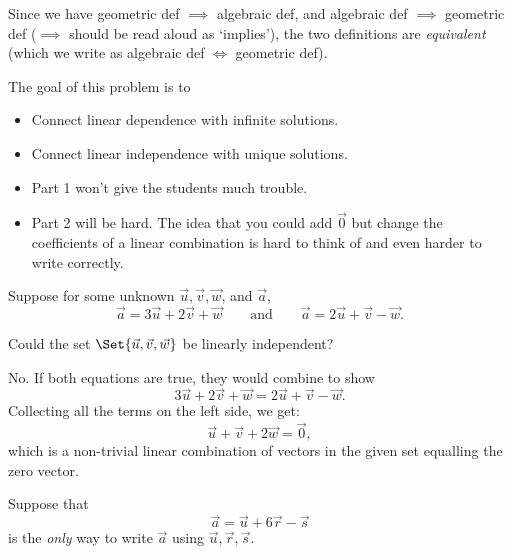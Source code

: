 	Since we have geometric def $\implies$ algebraic def, and algebraic def $\implies$ geometric def
	($\implies$ should be read aloud as `implies'), the two definitions
	are \emph{equivalent} (which we write as algebraic def $\iff$ geometric def).


	\displayonlynewpage
	\bookonlynewpage
	\question
	\begin{annotation}
		\begin{goals}

			The goal of this problem is to
			\begin{itemize}
				\item Connect linear dependence with infinite solutions.
				\item Connect linear independence with unique solutions.
			\end{itemize}
		\end{goals}

		\begin{notes}
			\begin{itemize}
				\item Part 1 won't give the students much trouble.
				\item Part 2 will be hard. The idea that you could add $\vec 0$
					but change the coefficients of a linear combination
					is hard to think of and even harder to write correctly.
			\end{itemize}
		\end{notes}
	\end{annotation}
	Suppose for some unknown $\vec u, \vec v, \vec w$, and $\vec a$,
	\[
		\vec a = 3\vec u+2\vec v +\vec w\qquad \text{and}\qquad
		\vec a = 2\vec u+\vec v -\vec w.
	\]
	\begin{parts}
		\item Could the set $\Set{\vec u,\vec v,\vec w}$ be linearly
		independent?
			\begin{solution}
				No. If both equations are true, they would combine to show
				\[
					3\vec u+2\vec v +\vec w = 2\vec u+\vec v -\vec w.
				\]
				Collecting all the terms on the left side, we get:
				\[
					\vec u + \vec v + 2\vec w = \vec 0,
				\]
				which is a non-trivial linear combination of vectors in the given
				set equalling the zero vector.
			\end{solution}
	\end{parts}
	Suppose that
	\[
		\vec a = \vec u+6\vec r-\vec s
	\]
	is the \emph{only} way to write $\vec a$ using $\vec u,\vec r,\vec s$.

